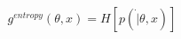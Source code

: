 \documentclass[preview]{standalone}
\begin{document}
\begin{align*}
g^{entropy}(\theta, x) = H[p(\dot |\theta, x)]
\end{align*}
\end{document}
